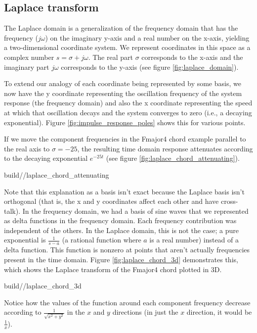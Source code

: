 \subsection{Laplace transform}

The Laplace domain is a generalization of the frequency domain that has the
frequency ($j\omega$) on the imaginary y-axis and a real number on the x-axis,
yielding a two-dimensional coordinate system. We represent coordinates in this
space as a complex number $s = \sigma + j\omega$. The real part $\sigma$
corresponds to the x-axis and the imaginary part $j\omega$ corresponds to the
y-axis (see figure \ref{fig:laplace_domain}).
\begin{bookfigure}

  \caption{Laplace domain}
  \label{fig:laplace_domain}
\end{bookfigure}

To extend our analogy of each coordinate being represented by some basis, we now
have the y coordinate representing the oscillation frequency of the
\gls{system response} (the frequency domain) and also the x coordinate
representing the speed at which that oscillation decays and the \gls{system}
converges to zero (i.e., a decaying exponential). Figure
\ref{fig:impulse_response_poles} shows this for various points.

If we move the component frequencies in the Fmajor4 chord example parallel to
the real axis to $\sigma = -25$, the resulting time domain response attenuates
according to the decaying exponential $e^{-25t}$ (see figure
\ref{fig:laplace_chord_attenuating}).
\begin{svg}{build/\sectionpath/laplace_chord_attenuating}
  \caption{Fmajor4 chord at $\sigma = 0$ and $\sigma = -25$}
  \label{fig:laplace_chord_attenuating}
\end{svg}

Note that this explanation as a basis isn't exact because the Laplace basis
isn't orthogonal (that is, the x and y coordinates affect each other and have
cross-talk). In the frequency domain, we had a basis of sine waves that we
represented as delta functions in the frequency domain. Each frequency
contribution was independent of the others. In the Laplace domain, this is not
the case; a pure exponential is $\frac{1}{s - a}$ (a rational function where $a$
is a real number) instead of a delta function. This function is nonzero at
points that aren't actually frequencies present in the time domain. Figure
\ref{fig:laplace_chord_3d} demonstrates this, which shows the Laplace transform
of the Fmajor4 chord plotted in 3D.
\begin{svg}{build/\sectionpath/laplace_chord_3d}
  \caption{Laplace transform of Fmajor4 chord plotted in 3D}
  \label{fig:laplace_chord_3d}
\end{svg}

Notice how the values of the function around each component frequency decrease
according to $\frac{1}{\sqrt{x^2 + y^2}}$ in the $x$ and $y$ directions (in just
the $x$ direction, it would be $\frac{1}{x}$).
